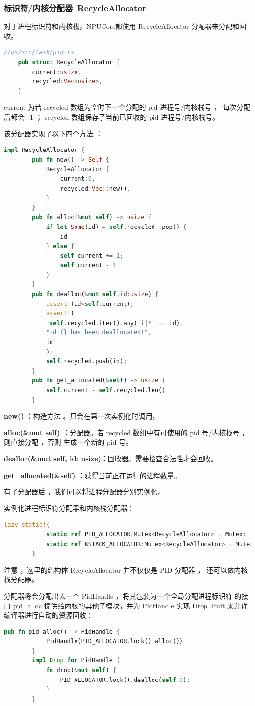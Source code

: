 \subsubsection{标识符/内核分配器\ RecycleAllocator}
对于进程标识符和内核栈，NPUCore都使用 RecycleAllocator 分配器来分配和回收。
\begin{lstlisting}[language=Rust]
	//os/src/task/pid.rs
	pub struct RecycleAllocator {
		current:usize,
		recycled:Vec<usize>,
	}
\end{lstlisting}

current 为若 recycled 数组为空时下⼀个分配的 pid 进程号/内核栈号 ，
每次分配后都会+1 ； recycled 数组保存了当前已回收的 pid 进程号/内核栈号。

该分配器实现了以下四个方法 ：

\begin{lstlisting}[language=Rust]
	impl RecycleAllocator {
		pub fn new() -> Self {
			RecycleAllocator {
				current:0,
				recycled:Vec::new(),
			}
		}
		pub fn alloc(&mut self) -> usize {
			if let Some(id) = self.recycled .pop() {
				id
			} else {
				self.current += 1;
				self.current - 1
			}
		}
		pub fn dealloc(&mut self,id:usize) {
			assert!(id<self.current);
			assert!(
			!self.recycled.iter().any(|i|*i == id),
			"id {} has been deallocated!",
			id
			);
			self.recycled.push(id);
		}
		pub fn get_allocated(&self) -> usize {
			self.current - self.recycled.len()
		}
	\end{lstlisting}
	
	\textbf{new() ：}构造方法 。只会在第⼀次实例化时调用。
	
\textbf{	alloc(\&mut self) ：}分配器。若 recycled 数组中有可使用的
	 pid 号/内核栈号 ，则直接分配 ，否则 生成⼀个新的 pid 号。
	
	\textbf{dealloc(\&mut self, id: usize)：}回收器。需要检查合法性才会回收。
	
\textbf{	get\_allocated(\&self) ：}获得当前正在运行的进程数量。
	
	有了分配器后 ，我们可以将进程分配器分别实例化，
	
	实例化进程标识符分配器和内核栈分配器：
	\begin{lstlisting}[language=Rust]
		lazy_static!{
			static ref PID_ALLOCATOR:Mutex<RecycleAllocator> = Mutex: :new(RecycleAllocator::new()
			static ref KSTACK_ALLOCATOR:Mutex<RecycleAllocator> = Mutex: :new(RecycleAllocator::new()
		}
	\end{lstlisting}
	
	注意 ，这里的结构体 RecycleAllocator 并不仅仅是 PID 分配器 ，
	还可以做内核栈分配器。 
	
	分配器将会分配出去一个 PidHandle ，将其包装为一个全局分配进程标识符
	的接口 pid\_alloc 提供给内核的其他子模块，并为 PidHandle 实现 
	Drop Trait 来允许编译器进行自动的资源回收：
	
	\begin{lstlisting}[language=Rust]
		pub fn pid_alloc() -> PidHandle {
			PidHandle(PID_ALLOCATOR.lock().alloc())
		}
		impl Drop for PidHandle {
			fn drop(&mut self) {
				PID_ALLOCATOR.lock().dealloc(self.0);
			}
		}
	\end{lstlisting}
	
